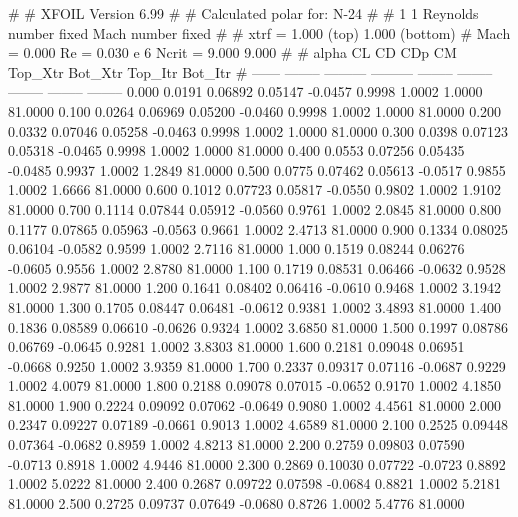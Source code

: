 #  
#       XFOIL         Version 6.99
#  
# Calculated polar for: N-24                                            
#  
# 1 1 Reynolds number fixed          Mach number fixed         
#  
# xtrf =   1.000 (top)        1.000 (bottom)  
# Mach =   0.000     Re =     0.030 e 6     Ncrit =   9.000  9.000
#  
#   alpha    CL        CD       CDp       CM     Top_Xtr  Bot_Xtr  Top_Itr  Bot_Itr
#  ------ -------- --------- --------- -------- -------- -------- -------- --------
   0.000   0.0191   0.06892   0.05147  -0.0457   0.9998   1.0002   1.0000  81.0000
   0.100   0.0264   0.06969   0.05200  -0.0460   0.9998   1.0002   1.0000  81.0000
   0.200   0.0332   0.07046   0.05258  -0.0463   0.9998   1.0002   1.0000  81.0000
   0.300   0.0398   0.07123   0.05318  -0.0465   0.9998   1.0002   1.0000  81.0000
   0.400   0.0553   0.07256   0.05435  -0.0485   0.9937   1.0002   1.2849  81.0000
   0.500   0.0775   0.07462   0.05613  -0.0517   0.9855   1.0002   1.6666  81.0000
   0.600   0.1012   0.07723   0.05817  -0.0550   0.9802   1.0002   1.9102  81.0000
   0.700   0.1114   0.07844   0.05912  -0.0560   0.9761   1.0002   2.0845  81.0000
   0.800   0.1177   0.07865   0.05963  -0.0563   0.9661   1.0002   2.4713  81.0000
   0.900   0.1334   0.08025   0.06104  -0.0582   0.9599   1.0002   2.7116  81.0000
   1.000   0.1519   0.08244   0.06276  -0.0605   0.9556   1.0002   2.8780  81.0000
   1.100   0.1719   0.08531   0.06466  -0.0632   0.9528   1.0002   2.9877  81.0000
   1.200   0.1641   0.08402   0.06416  -0.0610   0.9468   1.0002   3.1942  81.0000
   1.300   0.1705   0.08447   0.06481  -0.0612   0.9381   1.0002   3.4893  81.0000
   1.400   0.1836   0.08589   0.06610  -0.0626   0.9324   1.0002   3.6850  81.0000
   1.500   0.1997   0.08786   0.06769  -0.0645   0.9281   1.0002   3.8303  81.0000
   1.600   0.2181   0.09048   0.06951  -0.0668   0.9250   1.0002   3.9359  81.0000
   1.700   0.2337   0.09317   0.07116  -0.0687   0.9229   1.0002   4.0079  81.0000
   1.800   0.2188   0.09078   0.07015  -0.0652   0.9170   1.0002   4.1850  81.0000
   1.900   0.2224   0.09092   0.07062  -0.0649   0.9080   1.0002   4.4561  81.0000
   2.000   0.2347   0.09227   0.07189  -0.0661   0.9013   1.0002   4.6589  81.0000
   2.100   0.2525   0.09448   0.07364  -0.0682   0.8959   1.0002   4.8213  81.0000
   2.200   0.2759   0.09803   0.07590  -0.0713   0.8918   1.0002   4.9446  81.0000
   2.300   0.2869   0.10030   0.07722  -0.0723   0.8892   1.0002   5.0222  81.0000
   2.400   0.2687   0.09722   0.07598  -0.0684   0.8821   1.0002   5.2181  81.0000
   2.500   0.2725   0.09737   0.07649  -0.0680   0.8726   1.0002   5.4776  81.0000
